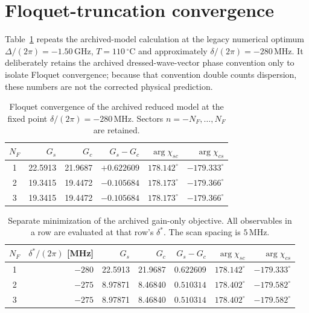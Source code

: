 \documentclass[11pt,a4paper]{article}
\newcommand{\GHz}{\,\mathrm{GHz}}
\newcommand{\MHz}{\,\mathrm{MHz}}
\newcommand{\degC}{\,^{\circ}\mathrm C}
\begin{document}
\section{Floquet-truncation convergence}

Table~\ref{tab:floquet-convergence} repeats the archived-model calculation at
the legacy numerical optimum
$\Delta/(2\pi)=-1.50\GHz$, $T=110\degC$ and approximately
$\delta/(2\pi)=-280\MHz$. It deliberately retains the archived
dressed-wave-vector phase convention only to isolate Floquet convergence;
because that convention double counts dispersion, these numbers are not the
corrected physical prediction.

\begin{table}[ht]
\centering
\caption{Floquet convergence of the archived reduced model at the fixed point
$\delta/(2\pi)=-280\MHz$. Sectors $n=-N_F,\ldots,N_F$ are retained.}
\label{tab:floquet-convergence}
\small
\begin{tabular}{c r r r r r}
\toprule
$N_F$ & $G_s$ & $G_c$ & $G_s-G_c$ &
$\arg\chi_{sc}$ & $\arg\chi_{cs}$\\
\midrule
1 & 22.5913 & 21.9687 & $+0.622609$ &
$178.142^\circ$ & $-179.333^\circ$\\
2 & 19.3415 & 19.4472 & $-0.105684$ &
$178.173^\circ$ & $-179.366^\circ$\\
3 & 19.3415 & 19.4472 & $-0.105684$ &
$178.173^\circ$ & $-179.366^\circ$\\
\bottomrule
\end{tabular}
\end{table}

\begin{table}[ht]
\centering
\caption{Separate minimization of the archived gain-only objective. All
observables in a row are evaluated at that row's $\delta^*$. The scan spacing
is $5\MHz$.}
\label{tab:legacy-delta-star}
\small
\begin{tabular}{c r r r r r r}
\toprule
$N_F$ & $\delta^*/(2\pi)$ [MHz] & $G_s$ & $G_c$ & $G_s-G_c$ &
$\arg\chi_{sc}$ & $\arg\chi_{cs}$\\
\midrule
1 & $-280$ & 22.5913 & 21.9687 & $0.622609$ &
$178.142^\circ$ & $-179.333^\circ$\\
2 & $-275$ & 8.97871 & 8.46840 & $0.510314$ &
$178.402^\circ$ & $-179.582^\circ$\\
3 & $-275$ & 8.97871 & 8.46840 & $0.510314$ &
$178.402^\circ$ & $-179.582^\circ$\\
\bottomrule
\end{tabular}
\end{table}
\end{document}
